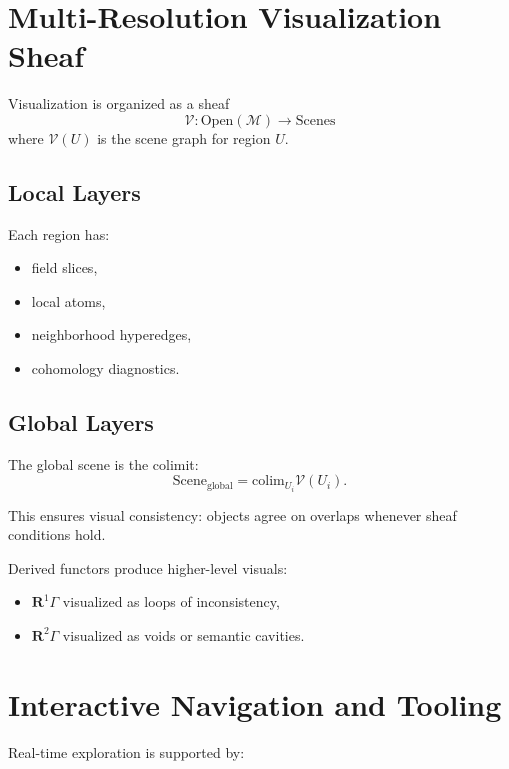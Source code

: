 \section{Multi-Resolution Visualization Sheaf}

Visualization is organized as a sheaf
\[
  \mathscr{V} : \mathrm{Open}(\mathcal{M}) \to \mathrm{Scenes}
\]
where $\mathscr{V}(U)$ is the scene graph for region $U$.

\subsection{Local Layers}

Each region has:
\begin{itemize}
\item field slices,
\item local atoms,
\item neighborhood hyperedges,
\item cohomology diagnostics.
\end{itemize}

\subsection{Global Layers}

The global scene is the colimit:
\[
  \mathrm{Scene}_{\mathrm{global}}
    = \mathrm{colim}_{U_i} \mathscr{V}(U_i).
\]

This ensures visual consistency:
objects agree on overlaps whenever sheaf conditions hold.

Derived functors produce higher-level visuals:
\begin{itemize}
\item $\mathbf{R}^1\Gamma$ visualized as loops of inconsistency,
\item $\mathbf{R}^2\Gamma$ visualized as voids or semantic cavities.
\end{itemize}


\section{Interactive Navigation and Tooling}

Real-time exploration is supported by:

